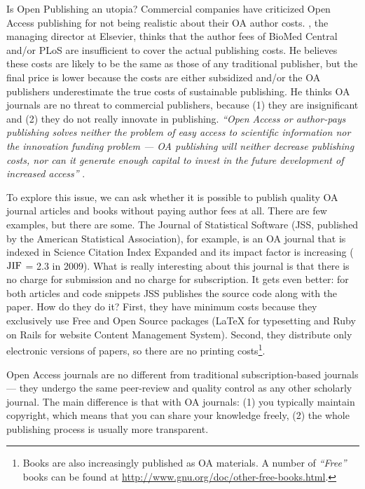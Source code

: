 \documentclass[graybox,envcountchap,sectrefs,UStrade]{svmono}
\begin{document}
Is Open Publishing an utopia? Commercial companies have criticized Open Access publishing for not being realistic about their OA author costs. \citet{Regazzi2004SR}, the managing director at Elsevier, thinks that the author fees of BioMed Central and/or PLoS are insufficient to cover the actual publishing costs. He believes these costs are likely to be the same as those of any traditional publisher, but the final price is lower because the costs are either subsidized and/or the OA publishers underestimate the true costs of sustainable publishing. He thinks OA journals are no threat to commercial publishers, because (1) they are insignificant and (2) they do not really innovate in publishing. \emph{``Open Access or author-pays publishing solves neither the problem of easy access to scientific information nor the innovation funding problem --- OA publishing will neither decrease publishing costs, nor can it generate enough capital to invest in the future development of increased access''} \citep{Regazzi2004SR}.\par

To explore this issue, we can ask whether it is possible to publish quality OA journal articles and books without paying author fees at all. There are few examples, but there are some. The Journal of Statistical Software (JSS, published by the American Statistical Association), for example, is an OA journal that is indexed in Science Citation Index Expanded and its impact factor is increasing (${\rm JIF}$ = 2.3 in 2009). What is really interesting about this journal is that there is no charge for submission and no charge for subscription. It gets even better: for both articles and code snippets JSS publishes the source code along with the paper. How do they do it? First, they have minimum costs because they exclusively use Free and Open Source packages ({\LaTeX} for typesetting and Ruby on Rails for website Content Management System). Second, they distribute only electronic versions of papers, so there are no printing costs\footnote{Books are also increasingly published as OA materials. A number of \emph{``Free''} books can be found at \url{http://www.gnu.org/doc/other-free-books.html}.}.\par

\begin{svgraybox}
Open Access journals are no different from traditional subscription-based journals --- they undergo the same peer-review and quality control as any other scholarly journal. The main difference is that with OA journals: (1) you typically maintain copyright, which means that you can share your knowledge freely, (2) the whole publishing process is usually more transparent.
\end{svgraybox}\label{R:OA}
\end{document}
